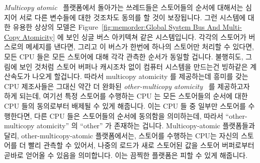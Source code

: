 \emph{Multicopy atomic}~\cite{Stone:1995:SP:623262.623912} 플랫폼에서 돌아가는
쓰레드들은 스토어들의 순서에 대해서는 심지어 서로 다른 변수들에 대한 것조차도
동의를 할 것이 보장됩니다.
그런 시스템에 대한 유용한 상상의 모델은
Figure~\ref{fig:memorder:Global System Bus And Multi-Copy Atomicity}
에 보인 싱글 버스 아키텍쳐 같은 시스템입니다.
각각의 스토어가 버스로의 메세지를 낸다면, 그리고 이 버스가 한번에 하나의
스토어만 처리할 수 있다면, 모든 CPU 들은 모든 스토어에 대해 각각 관측한 순서가
동일할 겁니다.
불행히도, 그림에 보인 것처럼 스토어 버퍼나 캐시조차 없이 컴퓨터 시스템을
만드는건 빙하같은 계산속도가 나오게 할겁니다.
따라서 multicopy atomicity 를 제공하는데 흥미를 갖는 CPU 제조사들은 그대신 약간
더 완화된 \emph{other-multicopy atomicity}~\cite[Section B2.3]{ARMv8A:2017} 를
제공하고자 하게 되는데, 여기선 특정 스토어를 수행하는 CPU 는 모든 스토어들의
순서에 대한 CPU 들의 동의로부터 배제될 수 있게 해줍니다.
이는 CPU 들 중 일부만 스토어를 수행한다면, 다른 CPU 들은 스토어들의 순서에
동의함을 의미하는데, 따라서 ``other-multicopy atomicity'' 의 ``other'' 가
존재하는 겁니다.
Multicopy-atomic 플랫폼들과 달리, other-multicopy-atomic 플랫폼에서는, 스토어를
수행하는 CPU는 자신의 스토어를 더 빨리 관측할 수 있어서, 나중의 로드가 새로
스토어된 값을 스토어 버퍼로부터 곧바로 얻어올 수 있음을 의미합니다.
이는 끔찍한 플랫폼은 피할 수 있게 해줍니다.

